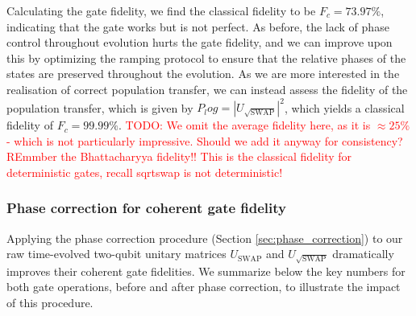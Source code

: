 \documentclass{subfiles}
\begin{document}
Calculating the gate fidelity, we find the classical fidelity to be $F_c = 73.97\%$, indicating that the gate works but is not perfect. As before, the lack of phase control throughout evolution hurts the gate fidelity, and we can improve upon this by optimizing the ramping protocol to ensure that the relative phases of the states are preserved throughout the evolution. As we are more interested in the realisation of correct population transfer, we can instead assess the fidelity of the population transfer, which is given by $ P_log = |U_{\sqrt{\text{SWAP}}}|^2$, which yields a classical fidelity of $F_c = 99.99\%$. \textcolor{red}{TODO: We omit the average fidelity here, as it is $\approx 25\%$ - which is not particularly impressive. Should we add it anyway for consistency? REmmber the Bhattacharyya fidelity!! This is the classical fidelity for deterministic gates, recall sqrtswap is not deterministic!}



\subsubsection*{Phase correction for coherent gate fidelity}
Applying the phase correction procedure (Section \ref{sec:phase_correction}) to our raw time-evolved two-qubit unitary matrices $U_{\text{SWAP}}$ and $U_{\sqrt{\text{SWAP}}}$ dramatically improves their coherent gate fidelities. We summarize below the key numbers for both gate operations, before and after phase correction, to illustrate the impact of this procedure.
\end{document}
